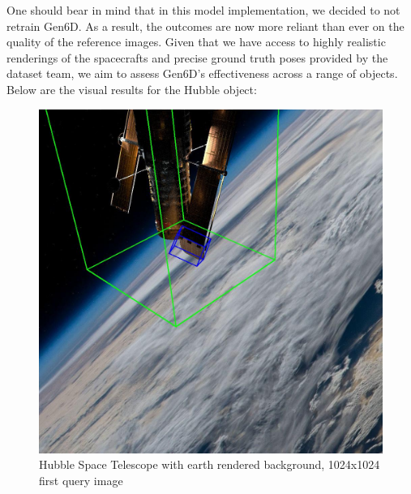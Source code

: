 \bigbreak 

One should bear in mind that in this model implementation, we decided to not retrain Gen6D. As a result, the outcomes are now more reliant than ever on the quality of the reference images. Given that we have access to highly realistic renderings of the spacecrafts and precise ground truth poses provided by the dataset team, we aim to assess Gen6D's effectiveness across a range of objects. Below are the visual results for the Hubble object:

\begin{figure}[h]
    \centering
    \begin{minipage}{0.45\linewidth}
        \centering
        \includegraphics[width=\linewidth]{data/fig2.jpg} %
        \caption{Hubble Space Telescope with earth rendered background, 1024x1024 first query image}
        \label{fig:image1}
    \end{minipage}\hfill
    \begin{minipage}{0.45\linewidth}
        \centering

\end{minipage}
\end{figure}
